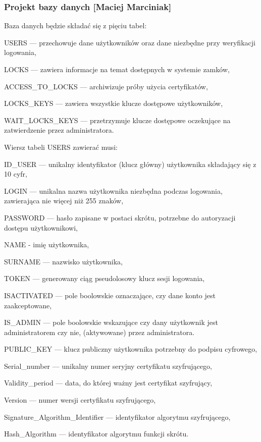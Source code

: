 \documentclass[twoside,10pt]{article}
\begin{document}
\subsubsection{Projekt bazy danych [Maciej Marciniak]} 
Baza danych będzie składać się z pięciu tabel:
\begin{itemize*}
\item {USERS} --- przechowuje dane użytkowników oraz dane niezbędne przy weryfikacji logowania,
\item {LOCKS} --- zawiera informacje na temat dostępnych w systemie zamków,
\item {ACCESS\_TO\_LOCKS} --- archiwizuje próby użycia certyfikatów,
\item {LOCKS\_KEYS} --- zawiera wszystkie klucze dostępowe użytkowników,
\item {WAIT\_LOCKS\_KEYS} --- przetrzymuje klucze dostępowe oczekujące na zatwierdzenie przez administratora.
\end{itemize*}

Wiersz tabeli USERS zawierać musi:
\begin{itemize*}
\item {ID\_USER} --- unikalny identyfikator (klucz główny) użytkownika składający się z 10 cyfr,
\item {LOGIN} --- unikalna nazwa użytkownika niezbędna podczas logowania, zawierająca nie więcej niż 255 znaków,
\item {PASSWORD} --- hasło zapisane w postaci skrótu, potrzebne do autoryzacji dostępu użytkownikowi,
\item {NAME} - imię użytkownika,
\item {SURNAME} --- nazwisko użytkownika,
\item {TOKEN} --- generowany ciąg pseudolosowy klucz sesji logowania,
\item  {ISACTIVATED} --- pole boolowskie oznaczające, czy dane konto jest zaakceptowane,
\item {IS\_ADMIN} --- pole boolowskie wskazujące czy dany użytkownik jest administratorem czy nie, (aktywowane) przez administratora.
\item {PUBLIC\_KEY} --- klucz publiczny użytkownika potrzebny do podpisu cyfrowego,
\item Serial\_number --- unikalny numer seryjny certyfikatu szyfrującego,
\item Validity\_period --- data, do której ważny jest certyfikat szyfrujący,
\item Version --- numer wersji certyfikatu szyfrującego,
\item Signature\_Algorithm\_Identifier --- identyfikator algorytmu szyfrującego,
\item Hash\_Algorithm --- identyfikator algorytmu funkcji skrótu.
\end{itemize*}
\end{document}
